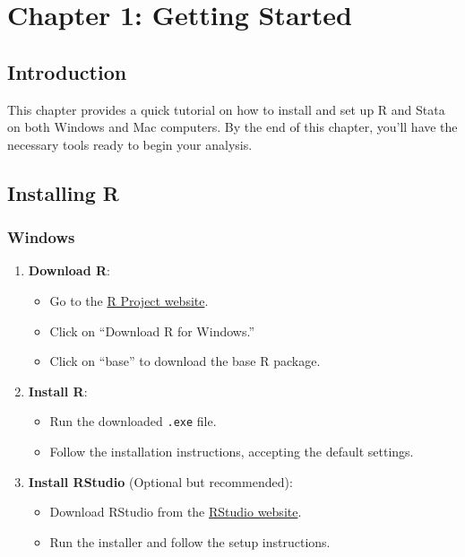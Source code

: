 \documentclass[
  letterpaper,
  DIV=11,
  numbers=noendperiod]{scrreprt}
\providecommand{\tightlist}{%
  \setlength{\itemsep}{0pt}\setlength{\parskip}{0pt}}\usepackage{longtable,booktabs,array}
\begin{document}

\chapter{Chapter 1: Getting Started}\label{chapter-1-getting-started}

\section{Introduction}\label{introduction-1}

This chapter provides a quick tutorial on how to install and set up R
and Stata on both Windows and Mac computers. By the end of this chapter,
you'll have the necessary tools ready to begin your analysis.

\section{Installing R}\label{installing-r}

\subsection{Windows}\label{windows}

\begin{enumerate}
\def\labelenumi{\arabic{enumi}.}
\tightlist
\item
  \textbf{Download R}:

  \begin{itemize}
  \tightlist
  \item
    Go to the \href{https://cran.r-project.org/}{R Project website}.
  \item
    Click on ``Download R for Windows.''
  \item
    Click on ``base'' to download the base R package.
  \end{itemize}
\item
  \textbf{Install R}:

  \begin{itemize}
  \tightlist
  \item
    Run the downloaded \texttt{.exe} file.
  \item
    Follow the installation instructions, accepting the default
    settings.
  \end{itemize}
\item
  \textbf{Install RStudio} (Optional but recommended):

  \begin{itemize}
  \tightlist
  \item
    Download RStudio from the
    \href{https://rstudio.com/products/rstudio/download/}{RStudio
    website}.
  \item
    Run the installer and follow the setup instructions.
  \end{itemize}
\end{enumerate}
\end{document}
